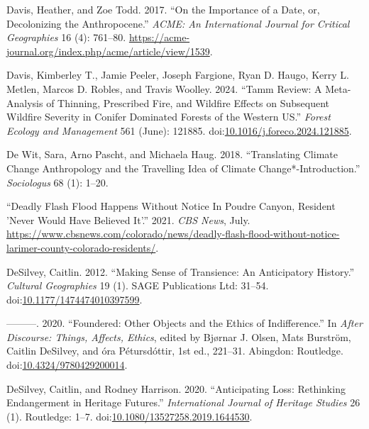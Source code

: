 \documentclass[
]{article}
\newlength{\cslhangindent}
\newenvironment{CSLReferences}[2] %
 {\begin{list}{}{%
  \setlength{\itemindent}{0pt}
  \setlength{\leftmargin}{0pt}
  \setlength{\parsep}{0pt}
  \ifodd #1
   \setlength{\leftmargin}{\cslhangindent}
   \setlength{\itemindent}{-1\cslhangindent}
  \fi
  \setlength{\itemsep}{#2\baselineskip}}}
 {\end{list}}
\begin{document}
\begin{CSLReferences}{1}{0}
Davis, Heather, and Zoe Todd. 2017. {``On the {Importance} of a {Date}, or, {Decolonizing} the {Anthropocene}.''} \emph{ACME: An International Journal for Critical Geographies} 16 (4): 761--80. \url{https://acme-journal.org/index.php/acme/article/view/1539}.

Davis, Kimberley T., Jamie Peeler, Joseph Fargione, Ryan D. Haugo, Kerry L. Metlen, Marcos D. Robles, and Travis Woolley. 2024. {``Tamm Review: {A} Meta-Analysis of Thinning, Prescribed Fire, and Wildfire Effects on Subsequent Wildfire Severity in Conifer Dominated Forests of the {Western US}.''} \emph{Forest Ecology and Management} 561 (June): 121885. doi:\href{https://doi.org/10.1016/j.foreco.2024.121885}{10.1016/j.foreco.2024.121885}.

De Wit, Sara, Arno Pascht, and Michaela Haug. 2018. {``Translating {Climate Change Anthropology} and the {Travelling Idea} of {Climate Change}*-{Introduction}.''} \emph{Sociologus} 68 (1): 1--20.

{``Deadly {Flash Flood Happens Without Notice In Poudre Canyon}, {Resident} '{Never Would Have Believed It}'.''} 2021. \emph{CBS News}, July. \url{https://www.cbsnews.com/colorado/news/deadly-flash-flood-without-notice-larimer-county-colorado-residents/}.

DeSilvey, Caitlin. 2012. {``Making Sense of Transience: An Anticipatory History.''} \emph{Cultural Geographies} 19 (1). SAGE Publications Ltd: 31--54. doi:\href{https://doi.org/10.1177/1474474010397599}{10.1177/1474474010397599}.

---------. 2020. {``Foundered: {Other} Objects and the Ethics of Indifference.''} In \emph{After {Discourse}: {Things}, {Affects}, {Ethics}}, edited by Bjørnar J. Olsen, Mats Burström, Caitlin DeSilvey, and óra Pétursdóttir, 1st ed., 221--31. Abingdon: Routledge. doi:\href{https://doi.org/10.4324/9780429200014}{10.4324/9780429200014}.

DeSilvey, Caitlin, and Rodney Harrison. 2020. {``Anticipating Loss: Rethinking Endangerment in Heritage Futures.''} \emph{International Journal of Heritage Studies} 26 (1). Routledge: 1--7. doi:\href{https://doi.org/10.1080/13527258.2019.1644530}{10.1080/13527258.2019.1644530}.


\end{CSLReferences}
\end{document}
